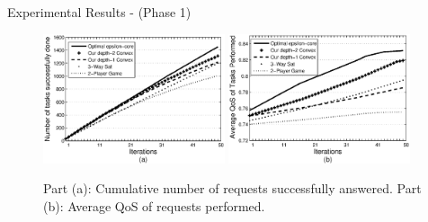 \documentclass{beamer}
\begin{document}
\begin{frame}{Experimental Results - (Phase 1)}

    \begin{figure}[!t]
    \centering
    \includegraphics[width=2.1in]{figures/task_done_opt.eps}
    \includegraphics[width=2.1in]{figures/task_qos_opt.eps}
    \caption{Part (a): Cumulative number of requests successfully
    answered. Part (b): Average QoS of requests performed.}
    \label{performanceall}
    \end{figure}

\end{frame}

\end{document}
